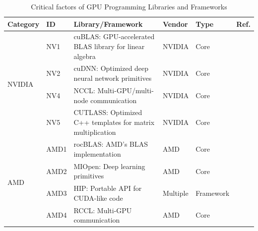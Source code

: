 \begin{table}[htbp]
	\centering
	\caption{Critical factors of GPU Programming Libraries and Frameworks}
	\label{tab:gpu_libraries}
	\begin{tabular}{llp{8cm}lll}
		\hline
		\small \textbf{Category} & \small \textbf{ID} & \small \textbf{Library/Framework}                                 & \small \textbf{Vendor} & \small \textbf{Type} & \small \textbf{Ref.}                                  \\
		\hline
		\multirow{4}{*}{\small NVIDIA}
		                         & \small NV1         & \small cuBLAS: GPU-accelerated BLAS library for linear algebra    & \small NVIDIA          & \small Core          & \small \cite{noauthor_cublas_nodate}                  \\[1ex]
		                         & \small NV2         & \small cuDNN: Optimized deep neural network primitives            & \small NVIDIA          & \small Core          & \small \cite{chetlur_cudnn_2014}                      \\[1ex]
		                         & \small NV4         & \small NCCL: Multi-GPU/multi-node communication                   & \small NVIDIA          & \small Core          & \small \cite{noauthor_nvidianccl_2025}                \\[1ex]
		                         & \small NV5         & \small CUTLASS: Optimized C++ templates for matrix multiplication & \small NVIDIA          & \small Core          & \small \cite{thakkar_cutlass_2023}                    \\
		\hline
		\multirow{4}{*}{\small AMD}
		                         & \small AMD1        & \small rocBLAS: AMD's BLAS implementation                         & \small AMD             & \small Core          & \small \cite{noauthor_rocmrocblas_2025}               \\[1ex]
		                         & \small AMD2        & \small MIOpen: Deep learning primitives                           & \small AMD             & \small Core          & \small \cite{noauthor_rocmmiopen_2025}                \\[1ex]
		                         & \small AMD3        & \small HIP: Portable API for CUDA-like code                       & \small Multiple        & \small Framework     & \small \cite{noauthor_rocmhip_2025}                   \\[1ex]
		                         & \small AMD4        & \small RCCL: Multi-GPU communication                              & \small AMD             & \small Core          & \small \cite{noauthor_rocmrccl_2025}                  \\

\end{tabular}
\end{table}
